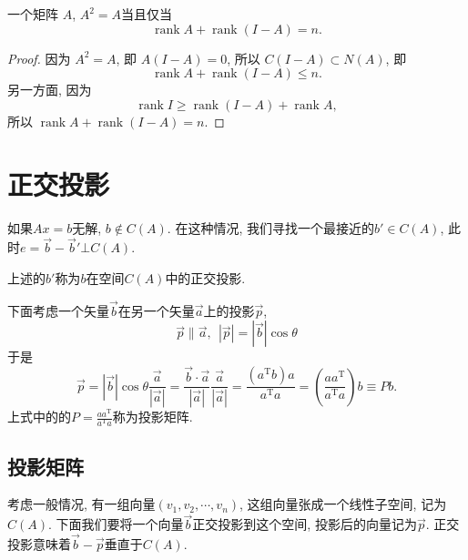 \begin{example}
  一个矩阵 $A$, $A^{2} = A$当且仅当
  \begin{equation}
    \operatorname{rank} A + \operatorname{rank} \left( I -A \right) = n.
  \end{equation}
\end{example}
\begin{proof}
  因为 $A^{2} = A$, 即 $A \left( I - A \right) = 0$, 所以 $C\left( I - A \right) \subset N \left( A \right)$, 即
  \begin{equation}
    \operatorname{rank} A + \operatorname{rank} \left( I -A \right) \le n.
  \end{equation}
  另一方面, 因为
  \begin{equation}
    \operatorname{rank} I \ge \operatorname{rank} \left( I - A \right) + \operatorname{rank} A,
  \end{equation}
  所以 $\operatorname{rank} A + \operatorname{rank} \left( I - A \right) = n$.
\end{proof}

\section{正交投影}

如果$Ax=b$无解, $b \notin C(A)$. 在这种情况, 我们寻找一个最接近的$b' \in C(A)$, 此时$e=\vec{b}-\vec{b}' \bot C(A)$.
\begin{definition}
    上述的$b'$称为$b$在空间$C(A)$中的正交投影.
\end{definition}

\begin{example}
    下面考虑一个矢量$\vec{b}$在另一个矢量$\vec{a}$上的投影$\vec{p}$,
    \begin{equation}
      \vec{p} \parallel \vec{a} ,\ \  |\vec{p}| = |\vec{b}| \cos \theta
    \end{equation}
    于是
    \begin{equation}
      \vec{p} = |\vec{b}|\cos\theta \frac{\vec{a}}{|\vec{a}|} =\frac{\vec{b}\cdot \vec{a}}{|\vec{a}|} \frac{\vec{a}}{|\vec{a}|}= \frac{\left( a^{\mathrm{T}}b \right) a}{a^{\mathrm{T}}a} = \left( \frac{a a^{\mathrm{T}}}{a^{\mathrm{T}} a} \right) b \equiv  P b.
    \end{equation}
    上式中的的$\displaystyle P= \frac{a a^{\mathrm{T}}}{a^{\mathrm{T}} a}$称为投影矩阵.
\end{example}

\subsection{投影矩阵}
考虑一般情况, 有一组向量$(v_1,v_2,\cdots,v_n)$, 这组向量张成一个线性子空间, 记为$C(A)$. 
下面我们要将一个向量$\vec{b}$正交投影到这个空间, 投影后的向量记为$\vec{p}$. 正交投影意味着$\vec{b}-\vec{p}$垂直于$C(A)$.

